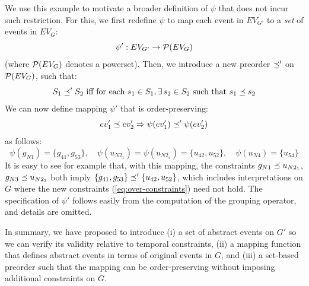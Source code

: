 We use this example to motivate a broader definition of $\psi$ that does not incur such restriction. For this, we first redefine $\psi$ to map each event in $EV_{G'}$ to a \textit{set} of events in $EV_{G}$:
\[ \psi': EV_{G'} \rightarrow {\cal P}(EV_{G}) \]
(where ${\cal P}(EV_{G})$ denotes a powerset).
%
Then, we introduce a new preorder $\preceq'$ on ${\cal P}(EV_{G})$, such that:
\[ S_1 \preorderprime S_2 \text{ iff for each } s_1 \in S_1, \exists s_2 \in S_2 \text{ such that } s_1 \preorder s_2 \]
We can now define mapping $\psi'$ that is order-preserving:
\[ ev_1' \preceq ev_2' \Rightarrow \psi(ev_1') \preceq' \psi(ev_2')  \]
as follows:
\begin{equation}
\psi(g_{N1}) = \{ g_{41}, g_{53} \},  \quad  \psi(u_{N2_1}) =  \psi(u_{N2_4}) = \{ u_{42}, u_{52} \}, \quad \psi(u_{N4}) = \{u_{54} \} \label{eq:psi-real}
\end{equation}
It is easy to see for example that, with this mapping, the constraints 
$g_{N1} \preceq u_{N2_1}$, $g_{N3} \preceq u_{N2_2}$ both imply $ \{ g_{41}, g_{53} \} \preceq'  \{ u_{42}, u_{52} \} $,
which includes interpretations on $G$ where the new constraints (\ref{eq:over-constraints}) need not hold.
The specification of $\psi'$ follows easily from the computation of the grouping operator, and details are omitted.

In summary, we have proposed to introduce (i) a set of abstract events on $G'$ so we can verify its validity relative to temporal constraints, (ii) a mapping function that defines abstract events in terms of original events in $G$, and (iii) a set-based preorder such that the mapping can be order-preserving without imposing additional constraints on $G$. 


